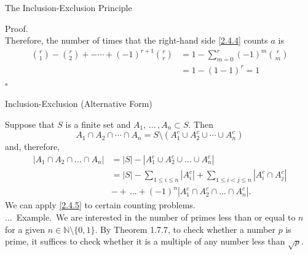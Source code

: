 \documentclass[smaller,hyperref={CJKbookmarks=true}]{beamer}
\newcommand{\N}{\mathbb{N}} \newcommand{\Z}{\mathbb{Z}} \newcommand{\Q}{\mathbb{Q}}
\newenvironment{PROOF}{{\noindent\!\sf\alert{Proof.}}\\}{\hfill$\square$\\}
\newcounter{zhuo}[subsection]
\renewcommand{\thezhuo}{\thesection.\thesubsection.\arabic{zhuo}}
\newenvironment{EXAMPLE}{\stepcounter{zhuo}\alert{\!\thezhuo.~Example.\,}}{}
\begin{document}
\begin{frame}{The Inclusion-Exclusion Principle}
\begin{spacing}{1.1}
\begin{PROOF}
Therefore, the number of times that the right-hand side \eqref{2.4.4} counts $a$ is
\begin{equation*}
  \begin{split}
     \binom{r}{1}-\binom{r}{2}+-\cdots+(-1)^{r+1}\binom{r}{r} &=1-\sum_{m=0}^{r}(-1)^m\binom{r}{m} \\
       &=1-(1-1)^r=1
  \end{split}
\end{equation*}
\end{PROOF}
\end{spacing}
\end{frame}
\begin{frame}[t]{Inclusion-Exclusion (Alternative Form)}
\begin{spacing}{1.05}
Suppose that $S$ is a finite set and $A_1,\,...\,,A_n\subset S$. Then
\[A_1\cap A_2\cap\cdots\cap A_n=S\setminus(A_1^c\cup A_2^c\cup\cdots\cup A_n^c)\]
and, therefore,
\begin{align}\label{2.4.5}
  |A_1\cap A_2\cap...\cap A_n| &=|S|-|A_1^c\cup A_2^c\cup...\cup A_n^c|\nonumber \\
   &=|S|-\sum_{1\leq i\leq n}|A_i^c|+\sum_{1\leq i<j\leq n}|A_i^c\cap A_j^c|\nonumber \\
   &-+\,...+(-1)^n|A_1^c\cap A_2^c\cap...\cap A_n^c|.
\end{align}
We can apply \eqref{2.4.5} to certain counting problems.\\[6pt]
\begin{EXAMPLE}
We are interested in the number of primes less than or equal to $n$ for a given $n\in\N\setminus\{0,1\}$. By Theorem 1.7.7, to check whether a number $p$ is prime, it suffices to check whether it is a multiple of any number less than $\sqrt{p}$.
\end{EXAMPLE}
\end{spacing}
\end{frame}
\end{document}
